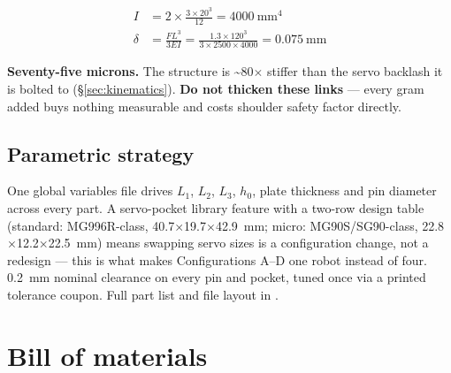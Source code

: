 \documentclass[11pt]{article}
\newcommand{\code}[1]{\texttt{\detokenize{#1}}}
\begin{document}
\begin{align*}
I &= 2\times\frac{3\times20^3}{12} = 4000~\text{mm}^4 \\
\delta &= \frac{FL^3}{3EI} = \frac{1.3 \times 120^3}{3\times2500\times4000} = 0.075~\text{mm}
\end{align*}

\textbf{Seventy-five microns.} The structure is \textasciitilde80$\times$ stiffer than the servo backlash it is bolted to (\S\ref{sec:kinematics}). \textbf{Do not thicken these links} --- every gram added buys nothing measurable and costs shoulder safety factor directly.

\subsection{Parametric strategy}
One global variables file drives $L_1$, $L_2$, $L_3$, $h_0$, plate thickness and pin diameter across every part. A servo-pocket library feature with a two-row design table (standard: MG996R-class, 40.7$\times$19.7$\times$42.9~mm; micro: MG90S/SG90-class, 22.8$\times$12.2$\times$22.5~mm) means swapping servo sizes is a configuration change, not a redesign --- this is what makes Configurations A--D one robot instead of four. 0.2~mm nominal clearance on every pin and pocket, tuned once via a printed tolerance coupon. Full part list and file layout in \code{cad/README.md}.

\section{Bill of materials}
\label{sec:bom}
\end{document}
